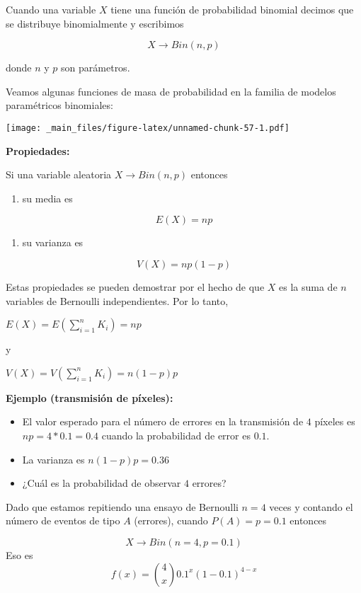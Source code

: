 \documentclass[
]{book}
\providecommand{\tightlist}{%
  \setlength{\itemsep}{0pt}\setlength{\parskip}{0pt}}
\begin{document}
Cuando una variable \(X\) tiene una función de probabilidad binomial decimos que se distribuye binomialmente y escribimos

\[X\rightarrow Bin(n,p)\]

donde \(n\) y \(p\) son parámetros.

Veamos algunas funciones de masa de probabilidad en la familia de modelos paramétricos binomiales:

\texttt{[image: \_main\_files/figure-latex/unnamed-chunk-57-1.pdf]}

\textbf{Propiedades:}

Si una variable aleatoria \(X\rightarrow Bin(n,p)\) entonces

\begin{enumerate}
\def\labelenumi{\arabic{enumi})}
\tightlist
\item
  su media es
\end{enumerate}

\[E(X)=np\]

\begin{enumerate}
\def\labelenumi{\arabic{enumi})}
\setcounter{enumi}{1}
\tightlist
\item
  su varianza es
\end{enumerate}

\[V(X)=np(1-p)\]

Estas propiedades se pueden demostrar por el hecho de que \(X\) es la suma de \(n\) variables de Bernoulli independientes. Por lo tanto,

\(E(X)=E(\sum_{i=1}^n K_i)=np\)

y

\(V(X)=V(\sum_{i=1}^n K_i)=n(1-p)p\)

\textbf{Ejemplo (transmisión de píxeles):}

\begin{itemize}
\item
  El valor esperado para el número de errores en la transmisión de \(4\) píxeles es \(np=4*0.1=0.4\) cuando la probabilidad de error es \(0.1\).
\item
  La varianza es \(n(1-p)p=0.36\)
\item
  ¿Cuál es la probabilidad de observar \(4\) errores?
\end{itemize}

Dado que estamos repitiendo una ensayo de Bernoulli \(n=4\) veces y contando el número de eventos de tipo \(A\) (errores), cuando \(P(A)=p=0.1\) entonces

\[X \rightarrow Bin(n=4, p=0.1)\]
Eso es \[f(x)=\binom 4 x 0.1^x(1-0.1)^{4-x}\]
\end{document}
